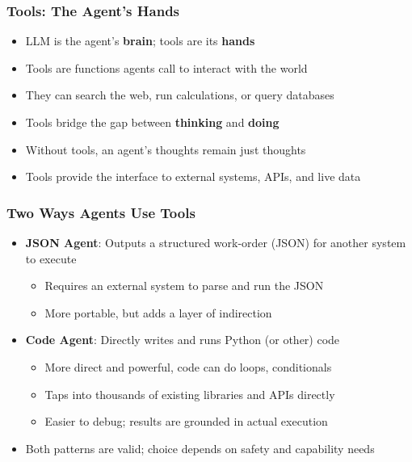 \begin{frame}[fragile]\frametitle{Tools: The Agent's Hands}
      \begin{itemize}
        \item LLM is the agent's \textbf{brain}; tools are its \textbf{hands}
        \item Tools are functions agents call to interact with the world
        \item They can search the web, run calculations, or query databases
        \item Tools bridge the gap between \textbf{thinking} and \textbf{doing}
        \item Without tools, an agent's thoughts remain just thoughts
        \item Tools provide the interface to external systems, APIs, and live data
      \end{itemize}
\end{frame}

\begin{frame}[fragile]\frametitle{Two Ways Agents Use Tools}
      \begin{itemize}
        \item \textbf{JSON Agent}: Outputs a structured work-order (JSON) for another system to execute
        \begin{itemize}
            \item Requires an external system to parse and run the JSON
            \item More portable, but adds a layer of indirection
        \end{itemize}
        \item \textbf{Code Agent}: Directly writes and runs Python (or other) code
        \begin{itemize}
            \item More direct and powerful, code can do loops, conditionals
            \item Taps into thousands of existing libraries and APIs directly
            \item Easier to debug; results are grounded in actual execution
        \end{itemize}
        \item Both patterns are valid; choice depends on safety and capability needs
      \end{itemize}
\end{frame}

